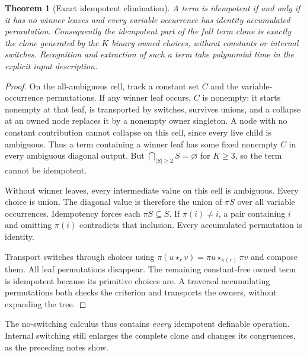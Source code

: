 \documentclass[11pt]{article}
\newtheorem{theorem}{Theorem}[section]
\begin{document}
\begin{theorem}[Exact idempotent elimination]\label{thm:core}
A term is idempotent if and only if it has no winner leaves and every
variable occurrence has identity accumulated permutation. Consequently
the idempotent part of the full term clone is exactly the clone generated
by the $K$ binary owned choices, without constants or internal switches.
Recognition and extraction of such a term take polynomial time in the
explicit input description.
\end{theorem}
\begin{proof}
On the all-ambiguous cell, track a constant set $C$ and the
variable-occurrence permutations. If any winner leaf occurs, $C$ is
nonempty: it starts nonempty at that leaf, is transported by switches,
survives unions, and a collapse at an owned node replaces it by a
nonempty owner singleton. A node with no constant contribution cannot
collapse on this cell, since every live child is ambiguous. Thus a term
containing a winner leaf has some fixed nonempty $C$ in every ambiguous
diagonal output. But $\bigcap_{|S|\geq2}S=\varnothing$ for $K\geq3$,
so the term cannot be idempotent.

Without winner leaves, every intermediate value on this cell is
ambiguous. Every choice is union. The diagonal value is therefore the
union of $\pi S$ over all variable occurrences. Idempotency forces each
$\pi S\subseteq S$. If $\pi(i)\ne i$, a pair containing $i$ and omitting
$\pi(i)$ contradicts that inclusion. Every accumulated permutation is
identity.

Transport switches through choices using
$\pi(u\star_r v)=\pi u\star_{\pi(r)}\pi v$ and compose them.
All leaf permutations disappear. The remaining constant-free owned term
is idempotent because its primitive choices are. A traversal accumulating
permutations both checks the criterion and transports the owners,
without expanding the tree.
\end{proof}

The no-switching calculus thus contains \emph{every} idempotent definable
operation. Internal switching still enlarges the complete clone and
changes its congruences, as the preceding notes show.
\end{document}

